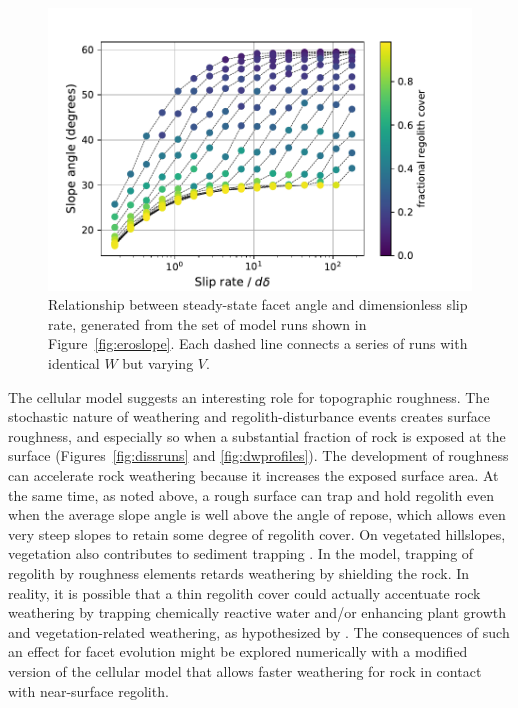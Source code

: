 \begin{figure}[ht!]
\centerline{\includegraphics{Figures/slope_angle_vs_slip_rate_by_frac_soil.pdf}}
\caption{Relationship between steady-state facet angle and dimensionless slip rate, generated from the set of model runs shown in Figure~\ref{fig:eroslope}. Each dashed line connects a series of runs with identical $W$ but varying $V$.}
\label{fig:slopeslip}
\end{figure}

The cellular model suggests an interesting role for topographic roughness. The stochastic nature of weathering and regolith-disturbance events creates surface roughness, and especially so when a substantial fraction of rock is exposed at the surface (Figures~\ref{fig:dissruns} and \ref{fig:dwprofiles}). The development of roughness can accelerate rock weathering because it increases the exposed surface area. At the same time, as noted above, a rough surface can trap and hold regolith even when the average slope angle is well above the angle of repose, which allows even very steep slopes to retain some degree of regolith cover. On vegetated hillslopes, vegetation also contributes to sediment trapping \citep{dibiase2013vegetation,doane2018nonlocal}. In the model, trapping of regolith by roughness elements retards weathering by shielding the rock. In reality, it is possible that a thin regolith cover could actually accentuate rock weathering by trapping chemically reactive water and/or enhancing plant growth and vegetation-related weathering, as hypothesized by \citet{gilbert1877report}. The consequences of such an effect for facet evolution might be explored numerically with a modified version of the cellular model that allows faster weathering for rock in contact with near-surface regolith.

